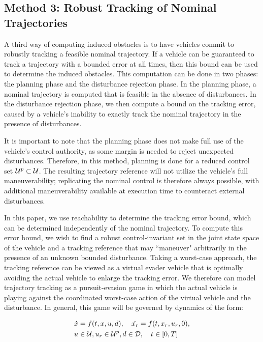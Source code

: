 \subsection{Method 3: Robust Tracking of Nominal Trajectories \label{sec:rtt}}
A third way of computing induced obstacles is to have vehicles commit to robustly tracking a feasible nominal trajectory. If a vehicle can be guaranteed to track a trajectory with a bounded error at all times, then this bound can be used to determine the induced obstacles. This computation can be done in two phases: the planning phase and the disturbance rejection phase. 
In the planning phase, a nominal trajectory is computed that is feasible in the absence of disturbances. In the disturbance rejection phase, we then compute a bound on the tracking error, caused by a vehicle's inability to exactly track the nominal trajectory in the presence of disturbances. 

It is important to note that the planning phase does not make full use of the vehicle's control authority, as some margin is needed to reject unexpected disturbances. Therefore, in this method, planning is done for a reduced control set $\mathcal{U}^p\subset\mathcal{U}$. The resulting trajectory reference will not utilize the vehicle's full maneuverability; replicating the nominal control is therefore always possible, with additional maneuverability available at execution time to counteract external disturbances.

In this paper, we use reachability to determine the tracking error bound, which can be determined independently of the nominal trajectory. To compute this error bound, we wish to find a robust control-invariant set in the joint state space of the vehicle and a tracking reference that may ``maneuver" arbitrarily in the presence of an unknown bounded disturbance. Taking a worst-case approach, the tracking reference can be viewed as a virtual evader vehicle that is optimally avoiding the actual vehicle to enlarge the tracking error. We therefore can model trajectory tracking as a pursuit-evasion game in which the actual vehicle is playing against the coordinated worst-case action of the virtual vehicle and the disturbance. In general, this game will be governed by dynamics of the form:

\begin{equation}
\label{eq:jdyn} %
\begin{aligned}
\dot{x} &= f(t, x, u, d), \quad \dot{x_r} =f(t,x_r,u_r,0),\\
u &\in \cset, u_r\in\cset^p, d \in \dset, \quad t \in [0, T]
\end{aligned}
\end{equation}

